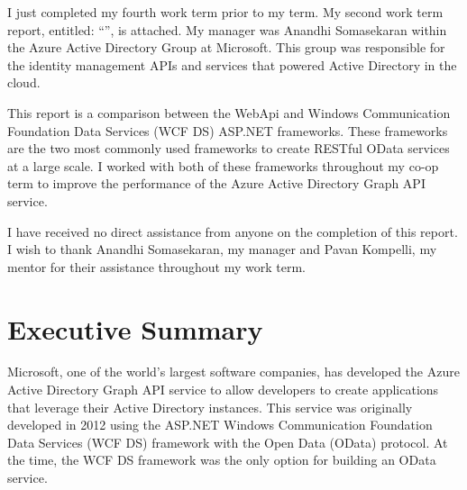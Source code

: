 \documentclass[se]{uw-wkrpt}
\begin{document}
\frontmatter

\begin{letter}

I just completed my fourth work term prior to my \theterm{} term. My second work term report, entitled: ``\thetitle'', is attached. My manager was Anandhi Somasekaran within the Azure Active Directory Group at Microsoft. This group was responsible for the identity management APIs and services that powered Active Directory in the cloud.

This report is a comparison between the WebApi and Windows Communication Foundation Data Services (WCF DS) ASP.NET frameworks. These frameworks are the two most commonly used frameworks to create RESTful OData services at a large scale. I worked with both of these frameworks throughout my co-op term to improve the performance of the Azure Active Directory Graph API service.

I have received no direct assistance from anyone on the completion of this report. I wish to thank Anandhi Somasekaran, my manager and Pavan Kompelli, my mentor for their assistance throughout my work term.

\end{letter}

\section{Executive Summary}

Microsoft, one of the world's largest software companies, has developed the Azure Active Directory Graph API service to allow developers to create applications that leverage their Active Directory instances. This service was originally developed in 2012 using the ASP.NET Windows Communication Foundation Data Services (WCF DS) framework with the Open Data (OData) protocol. At the time, the WCF DS framework was the only option for building an OData service.
\end{document}
